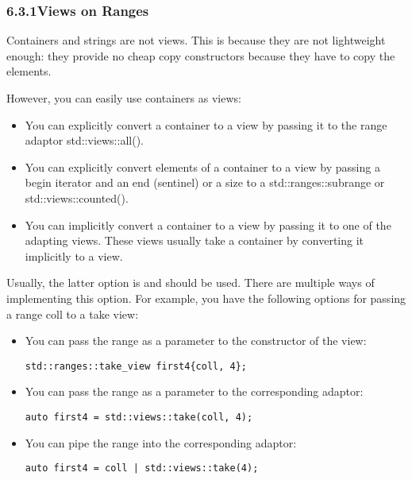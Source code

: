 \subsubsection*{ 6.3.1\hspace{0.2cm}Views on Ranges}

Containers and strings are not views. This is because they are not lightweight enough: they provide no cheap copy constructors because they have to copy the elements.

However, you can easily use containers as views:

\begin{itemize}
\item
You can explicitly convert a container to a view by passing it to the range adaptor std::views::all().

\item
You can explicitly convert elements of a container to a view by passing a begin iterator and an end (sentinel) or a size to a std::ranges::subrange or std::views::counted().

\item
You can implicitly convert a container to a view by passing it to one of the adapting views. These views usually take a container by converting it implicitly to a view.
\end{itemize}

Usually, the latter option is and should be used. There are multiple ways of implementing this option. For example, you have the following options for passing a range coll to a take view:

\begin{itemize}
\item
You can pass the range as a parameter to the constructor of the view:

\begin{lstlisting}[style=styleCXX]
std::ranges::take_view first4{coll, 4};
\end{lstlisting}

\item
You can pass the range as a parameter to the corresponding adaptor:

\begin{lstlisting}[style=styleCXX]
auto first4 = std::views::take(coll, 4);
\end{lstlisting}

\item
You can pipe the range into the corresponding adaptor:

\begin{lstlisting}[style=styleCXX]
auto first4 = coll | std::views::take(4);
\end{lstlisting}
\end{itemize}

